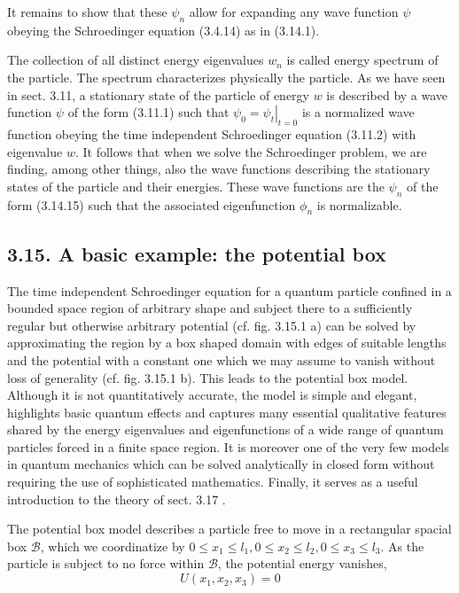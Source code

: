 \documentclass{article}
\begin{document}
It remains to show that these $\psi_{n}$ allow for expanding any wave function $\psi$ obeying the Schroedinger equation (3.4.14) as in (3.14.1).

The collection of all distinct energy eigenvalues $w_{n}$ is called energy spectrum of the particle. The spectrum characterizes physically the particle. As we have seen in sect. 3.11, a stationary state of the particle of energy $w$ is described by a wave function $\psi$ of the form (3.11.1) such that $\psi_{0}=\left.\psi_{t}\right|_{t=0}$ is a normalized wave function obeying the time independent Schroedinger equation (3.11.2) with eigenvalue $w$. It follows that when we solve the Schroedinger problem, we are finding, among other things, also the wave functions describing the stationary states of the particle and their energies. These wave functions are the $\psi_{n}$ of the form (3.14.15) such that the associated eigenfunction $\phi_{n}$ is normalizable.

\subsection*{3.15. A basic example: the potential box}

The time independent Schroedinger equation for a quantum particle confined in a bounded space region of arbitrary shape and subject there to a sufficiently regular but otherwise arbitrary potential (cf. fig. 3.15.1 a) can be solved by approximating the region by a box shaped domain with edges of suitable lengths and the potential with a constant one which we may assume to vanish without loss of generality (cf. fig. 3.15.1 b). This leads to the potential box model. Although it is not quantitatively accurate, the model is simple and elegant, highlights basic quantum effects and captures many essential qualitative features shared by the energy eigenvalues and eigenfunctions of a wide range of quantum particles forced in a finite space region. It is moreover one of the very few models in quantum mechanics which can be solved analytically in closed form without requiring the use of sophisticated mathematics. Finally, it serves as a useful introduction to the theory of sect. 3.17 .

The potential box model describes a particle free to move in a rectangular spacial box $\mathcal{B}$, which we coordinatize by $0 \leq x_{1} \leq l_{1}, 0 \leq x_{2} \leq l_{2}, 0 \leq x_{3} \leq l_{3}$. As the particle is subject to no force within $\mathcal{B}$, the potential energy vanishes,
$$
\begin{equation*}
U\left(x_{1}, x_{2}, x_{3}\right)=0 \tag{3.15.1}
\end{equation*}
$$
\end{document}
